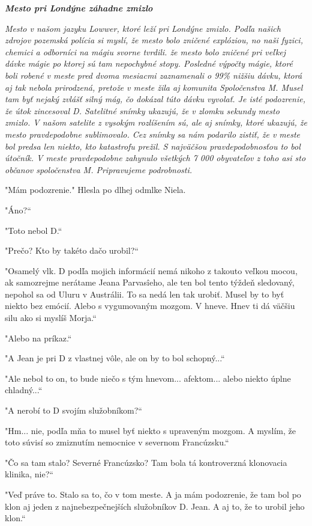 \documentclass{book}
\begin{document}
\begin{center}
\textit{\textbf{Mesto pri Londýne záhadne zmizlo}}

\textit{Mesto v našom jazyku Lowwer, ktoré leží pri Londýne zmizlo. Podľa našich zdrojov pozemská polícia si myslí, že mesto bolo zničené explóziou, no naši fyzici, chemici a odborníci na mágiu svorne tvrdili. že mesto bolo zničené pri veľkej dávke mágie po ktorej sú tam nepochybné stopy. Posledné výpočty mágie, ktoré boli robené v meste pred dvoma mesiacmi zaznamenali o 99\% nižšiu dávku, ktorá aj tak nebola prirodzená, pretože v meste žila aj komunita Spoločenstva M. Musel tam byť nejaký zvlášť silný mág, čo dokázal túto dávku vyvolať. Je isté podozrenie, že útok zincesoval D. Satelitné snímky ukazujú, že v zlomku sekundy mesto zmizlo. V našom satelite z vysokým rozlíšením sú, ale aj snímky, ktoré ukazujú, že mesto pravdepodobne sublimovalo. Cez snímky sa nám podarilo zistiť, že v meste bol predsa len niekto, kto katastrofu prežil. S najväčšou pravdepodobnosťou to bol útočník. V meste pravdepodobne zahynulo všetkých 7 000 obyvateľov z toho asi sto občanov spoločenstva M. Pripravujeme podrobnosti.}
\end{center}

"Mám podozrenie."$ $ Hlesla po dlhej odmlke Niela.

"Áno?“

"Toto nebol D.“

"Prečo? Kto by takéto dačo urobil?“

"$ $Osamelý vlk. D podľa mojich informácií nemá nikoho z takouto veľkou mocou, ak samozrejme nerátame Jeana Parvasîeho, ale ten bol tento týždeň sledovaný, nepohol sa od Uluru v Austrálii. To sa nedá len tak urobiť. Musel by to byť niekto bez emócií. Alebo s vygumovaným mozgom. V hneve. Hnev ti dá väčšiu silu ako si myslíš Morja.“

"$ $Alebo na príkaz.“

"$ $A Jean je pri D z vlastnej vôle, ale on by to bol schopný...“

"$ $Ale nebol to on, to bude niečo s tým hnevom... afektom... alebo niekto úplne chladný...“

"$ $A nerobí to D svojím služobníkom?“

"Hm... nie, podľa mňa to musel byť niekto s upraveným mozgom. A myslím, že toto súvisí so zmiznutím nemocnice v severnom Francúzsku.“

"Čo sa tam stalo? Severné Francúzsko? Tam bola tá kontroverzná klonovacia klinika, nie?“

"Veď práve to. Stalo sa to, čo v tom meste. A ja mám podozrenie, že tam bol po klon aj jeden z najnebezpečnejších služobníkov D. Jean. A aj to, že to urobil jeho klon.“
\end{document}
